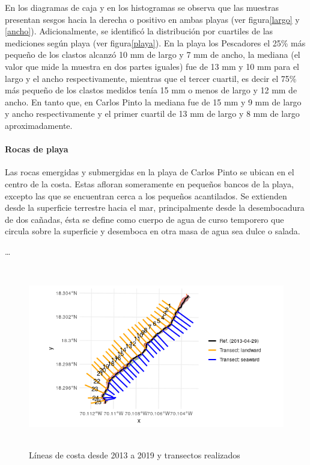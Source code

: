 \documentclass[11pt,]{article}
\begin{document}
En los diagramas de caja y en los histogramas se observa que las
muestras presentan sesgos hacia la derecha o positivo en ambas playas
(ver figura\ref{largo} y \ref{ancho}). Adicionalmente, se identificó la
distribución por cuartiles de las mediciones según playa (ver
figura\ref{playa}). En la playa los Pescadores el 25\% más pequeño de
los clastos alcanzó 10 mm de largo y 7 mm de ancho, la mediana (el valor
que mide la muestra en dos partes iguales) fue de 13 mm y 10 mm para el
largo y el ancho respectivamente, mientras que el tercer cuartil, es
decir el 75\% más pequeño de los clastos medidos tenía 15 mm o menos de
largo y 12 mm de ancho. En tanto que, en Carlos Pinto la mediana fue de
15 mm y 9 mm de largo y ancho respectivamente y el primer cuartil de 13
mm de largo y 8 mm de largo aproximadamente.

\paragraph{Rocas de playa}\label{rocas-de-playa}

Las rocas emergidas y submergidas en la playa de Carlos Pinto se ubican
en el centro de la costa. Estas afloran someramente en pequeños bancos
de la playa, excepto las que se encuentran cerca a los pequeños
acantilados. Se extienden desde la superficie terrestre hacia el mar,
principalmente desde la desembocadura de dos cañadas, ésta se define
como cuerpo de agua de curso temporero que circula sobre la superficie y
desemboca en otra masa de agua sea dulce o salada.

\ldots

\begin{figure}
\centering
\includegraphics[height=3.12500in]{transect_linea_R.png}
\caption{Líneas de costa desde 2013 a 2019 y transectos
realizados\label{lineas}}
\end{figure}
\end{document}
